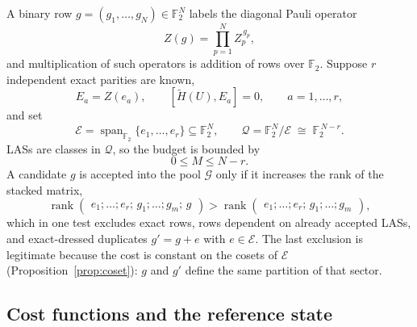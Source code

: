 \documentclass[11pt]{article}
\newcommand{\Ht}{\widetilde H}
\newcommand{\FF}{\mathbb F_2}
\newcommand{\Ecal}{\mathcal E}
\newcommand{\Qcal}{\mathcal Q}
\newcommand{\Gcal}{\mathcal G}
\begin{document}
A binary row $g=(g_1,\dots,g_N)\in\FF^{N}$ labels the diagonal Pauli operator
\begin{equation}
Z(g)=\prod_{p=1}^{N}Z_p^{\,g_p},
\label{eq:Zg}
\end{equation}
and multiplication of such operators is addition of rows over $\FF$. Suppose
$r$ independent exact parities are known,
\begin{equation}
E_a=Z(e_a),\qquad [\Ht(U),E_a]=0,\qquad a=1,\dots,r,
\label{eq:exact}
\end{equation}
and set
\begin{equation}
\Ecal=\operatorname{span}_{\FF}\{e_1,\dots,e_r\}\subseteq\FF^{N},
\qquad
\Qcal=\FF^{N}/\Ecal\;\cong\;\FF^{\,N-r}.
\label{eq:quotient}
\end{equation}
LASs are classes in $\Qcal$, so the budget is bounded by
\begin{equation}
0\le M\le N-r .
\label{eq:budget}
\end{equation}
A candidate $g$ is accepted into the pool $\Gcal$ only if it increases the
rank of the stacked matrix,
\begin{equation}
\operatorname{rank}\begin{pmatrix}e_1;\dots;e_r;\,g_1;\dots;g_m;\,g\end{pmatrix}
>
\operatorname{rank}\begin{pmatrix}e_1;\dots;e_r;\,g_1;\dots;g_m\end{pmatrix},
\label{eq:ranktest}
\end{equation}
which in one test excludes exact rows, rows dependent on already accepted
LASs, and exact-dressed duplicates $g'=g+e$ with $e\in\Ecal$. The last
exclusion is legitimate because the cost is constant on the cosets of $\Ecal$
(Proposition~\ref{prop:coset}): $g$ and $g'$ define the same partition of that
sector.

\subsection{Cost functions and the reference state}
\end{document}
